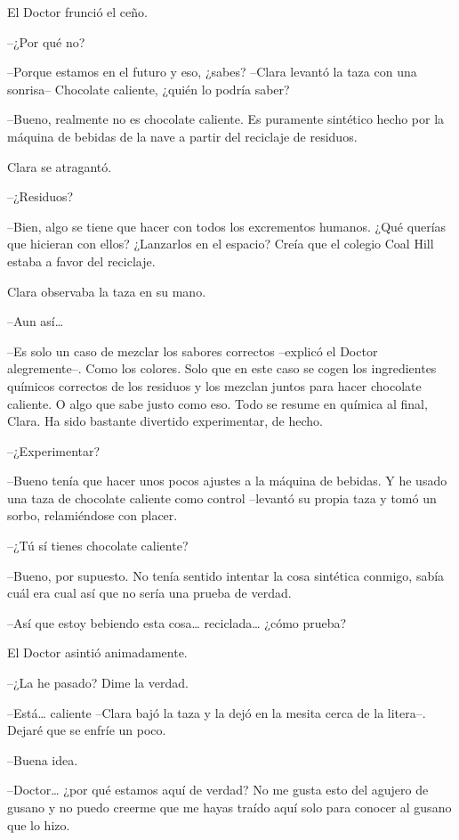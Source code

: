 {El Doctor frunció el ceño.}

{--¿Por qué no?}

{--Porque estamos en el futuro y eso, ¿sabes? --Clara levantó la taza con
una sonrisa-- Chocolate caliente, ¿quién lo podría saber?}

{--Bueno, realmente no es chocolate caliente. Es puramente sintético
 hecho por la máquina de bebidas de la nave a partir del reciclaje de
residuos.}

{Clara se atragantó.}

{--¿Residuos?}

{--Bien, algo se tiene que hacer con todos los excrementos humanos. ¿Qué
 querías que hicieran con ellos? ¿Lanzarlos en el espacio? Creía que el
colegio Coal Hill estaba a favor del reciclaje.}

{Clara observaba la taza en su mano.}

{--Aun así\ldots{}}

{--Es solo un caso de mezclar los sabores correctos --explicó el Doctor
 alegremente--. Como los colores. Solo que en este caso se cogen los
 ingredientes químicos correctos de los residuos y los mezclan juntos
 para hacer chocolate caliente. O algo que sabe justo como eso. Todo se
 resume en química al final, Clara. Ha sido bastante divertido
experimentar, de hecho.}

{--¿Experimentar?}

{--Bueno tenía que hacer unos pocos ajustes a la máquina de bebidas. Y he
 usado una taza de chocolate caliente como control --levantó su propia
taza y tomó un sorbo, relamiéndose con placer.}

{--¿Tú sí tienes chocolate caliente?}

{--Bueno, por supuesto. No tenía sentido intentar la cosa sintética
conmigo, sabía cuál era cual así que no sería una prueba de verdad.}

{--Así que estoy bebiendo esta cosa\ldots{} reciclada\ldots{} ¿cómo
prueba?}

{El Doctor asintió animadamente.}

{--¿La he pasado? Dime la verdad.}

{--Está\ldots{} caliente --Clara bajó la taza y la dejó en la mesita
cerca de la litera--. Dejaré que se enfríe un poco.}

{--Buena idea.}

{--Doctor\ldots{} ¿por qué estamos aquí de verdad? No me gusta esto del
 agujero de gusano y no puedo creerme que me hayas traído aquí solo para
conocer al gusano que lo hizo.}

